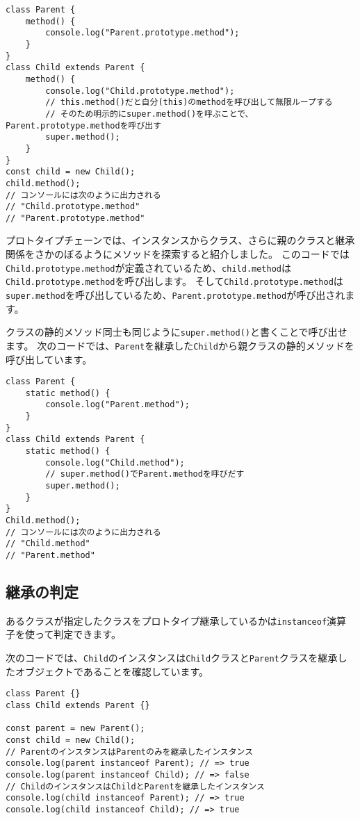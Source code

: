 \begin{lstlisting}
class Parent {
    method() {
        console.log("Parent.prototype.method");
    }
}
class Child extends Parent {
    method() {
        console.log("Child.prototype.method");
        // this.method()だと自分(this)のmethodを呼び出して無限ループする
        // そのため明示的にsuper.method()を呼ぶことで、Parent.prototype.methodを呼び出す
        super.method();
    }
}
const child = new Child();
child.method(); 
// コンソールには次のように出力される
// "Child.prototype.method"
// "Parent.prototype.method"
\end{lstlisting}

プロトタイプチェーンでは、インスタンスからクラス、さらに親のクラスと継承関係をさかのぼるようにメソッドを探索すると紹介しました。
このコードでは\texttt{Child.prototype.method}が定義されているため、\texttt{child.method}は\texttt{Child.prototype.method}を呼び出します。
そして\texttt{Child.prototype.method}は\texttt{super.method}を呼び出しているため、\texttt{Parent.prototype.method}が呼び出されます。

クラスの静的メソッド同士も同じように\texttt{super.method()}と書くことで呼び出せます。
次のコードでは、\texttt{Parent}を継承した\texttt{Child}から親クラスの静的メソッドを呼び出しています。

\begin{lstlisting}
class Parent {
    static method() {
        console.log("Parent.method");
    }
}
class Child extends Parent {
    static method() {
        console.log("Child.method");
        // super.method()でParent.methodを呼びだす
        super.method();
    }
}
Child.method(); 
// コンソールには次のように出力される
// "Child.method"
// "Parent.method"
\end{lstlisting}

\hypertarget{instanceof}{%
\subsection{継承の判定}\label{instanceof}}

あるクラスが指定したクラスをプロトタイプ継承しているかは\texttt{instanceof}演算子を使って判定できます。

次のコードでは、\texttt{Child}のインスタンスは\texttt{Child}クラスと\texttt{Parent}クラスを継承したオブジェクトであることを確認しています。

\begin{lstlisting}
class Parent {}
class Child extends Parent {}

const parent = new Parent();
const child = new Child();
// ParentのインスタンスはParentのみを継承したインスタンス
console.log(parent instanceof Parent); // => true
console.log(parent instanceof Child); // => false
// ChildのインスタンスはChildとParentを継承したインスタンス
console.log(child instanceof Parent); // => true
console.log(child instanceof Child); // => true
\end{lstlisting}

